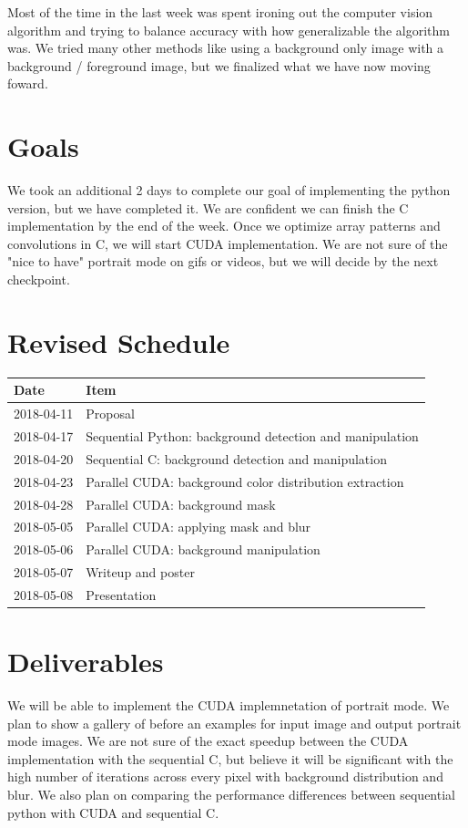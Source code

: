 \documentclass[12pt]{article}
\begin{document}
Most of the time in the last week was spent ironing out
the computer vision algorithm and trying to balance accuracy with
how generalizable the algorithm was. We tried many other methods like using
a background only image with a background / foreground image, but we finalized
what we have now moving foward.

\section*{Goals}
We took an additional 2 days to complete our goal of implementing the python
version, but we have completed it. We are confident we can finish the C
implementation by the end of the week. Once we optimize array patterns and
convolutions in C, we will start CUDA implementation. We are not sure of
the "nice to have" portrait mode on gifs or videos, but we will decide by the
next checkpoint.

\section*{Revised Schedule}

\begin{tabular}{l|l}
    Date & Item \\
    \hline
    2018-04-11 & Proposal \\
    2018-04-17 & Sequential Python: background detection and manipulation \\
    2018-04-20 & Sequential C: background detection and manipulation \\
    2018-04-23 & Parallel CUDA: background color distribution extraction \\
    2018-04-28 & Parallel CUDA: background mask \\
    2018-05-05 & Parallel CUDA: applying mask and blur \\
    2018-05-06 & Parallel CUDA: background manipulation \\
    2018-05-07 & Writeup and poster \\
    2018-05-08 & Presentation
\end{tabular}

\section*{Deliverables}
We will be able to implement the CUDA implemnetation of portrait mode.
We plan to show a gallery of before an examples for input image and output
portrait mode images. We are not sure of the exact speedup between the
CUDA implementation with the sequential C, but believe it will be significant
with the high number of iterations across every pixel with background
distribution and blur. We also plan on comparing the performance differences
between sequential python with CUDA and sequential C.
\end{document}
